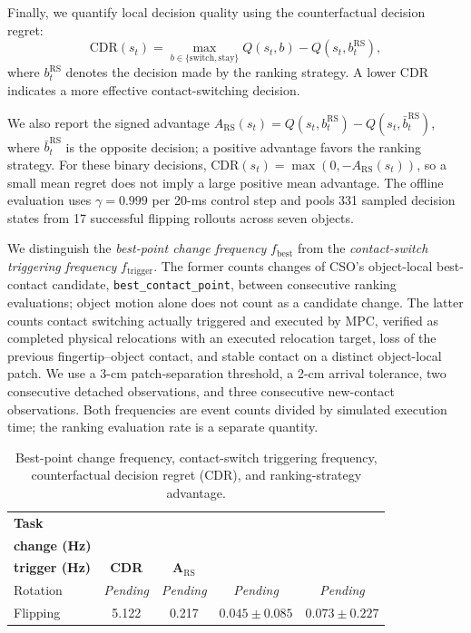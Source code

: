 Finally, we quantify local decision quality using the counterfactual decision regret:
\begin{equation}
\mathrm{CDR}(s_t)=
\max_{b\in\{\mathrm{switch},\mathrm{stay}\}}Q(s_t,b)
-Q(s_t,b_t^{\mathrm{RS}}),
\end{equation}
where $b_t^{\mathrm{RS}}$ denotes the decision made by the ranking strategy. A lower CDR indicates a more effective contact-switching decision.

We also report the signed advantage $A_{\mathrm{RS}}(s_t)=Q(s_t,b_t^{\mathrm{RS}})-Q(s_t,\bar b_t^{\mathrm{RS}})$, where $\bar b_t^{\mathrm{RS}}$ is the opposite decision; a positive advantage favors the ranking strategy. For these binary decisions, $\mathrm{CDR}(s_t)=\max(0,-A_{\mathrm{RS}}(s_t))$, so a small mean regret does not imply a large positive mean advantage. The offline evaluation uses $\gamma=0.999$ per 20-ms control step and pools 331 sampled decision states from 17 successful flipping rollouts across seven objects.

We distinguish the \emph{best-point change frequency} $f_{\mathrm{best}}$ from the \emph{contact-switch triggering frequency} $f_{\mathrm{trigger}}$. The former counts changes of CSO's object-local best-contact candidate, \texttt{best\_contact\_point}, between consecutive ranking evaluations; object motion alone does not count as a candidate change. The latter counts contact switching actually triggered and executed by MPC, verified as completed physical relocations with an executed relocation target, loss of the previous fingertip--object contact, and stable contact on a distinct object-local patch. We use a 3-cm patch-separation threshold, a 2-cm arrival tolerance, two consecutive detached observations, and three consecutive new-contact observations. Both frequencies are event counts divided by simulated execution time; the ranking evaluation rate is a separate quantity.

\begin{table}[t]
\centering
\caption{Best-point change frequency, contact-switch triggering frequency, counterfactual decision regret (CDR), and ranking-strategy advantage.}
\label{tab:ranking_frequency_cdr}
\footnotesize
\setlength{\tabcolsep}{2pt}
\begin{tabular*}{\columnwidth}{@{\extracolsep{\fill}} lcccc}
\toprule
\textbf{Task} & \shortstack{\textbf{Best-point}\\\textbf{change (Hz)}} & \shortstack{\textbf{Contact-switch}\\\textbf{trigger (Hz)}} & \textbf{CDR} & $\boldsymbol{A_{\mathrm{RS}}}$ \\
\midrule
Rotation & \textit{Pending} & \textit{Pending} & \textit{Pending} & \textit{Pending} \\
Flipping & 5.122 & 0.217 & $0.045 \pm 0.085$ & $0.073 \pm 0.227$ \\
\bottomrule
\end{tabular*}
\end{table}


